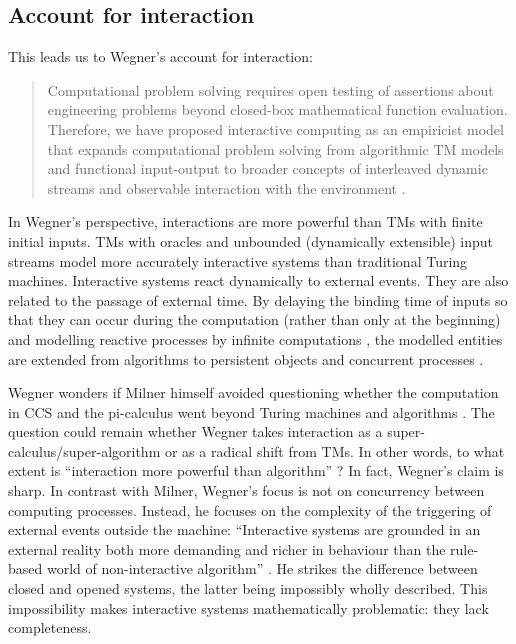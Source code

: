 \documentclass[a4paper, 11pt, twoside]{article}
\begin{document}
\subsection{Account for interaction}

This leads us to Wegner’s account for interaction: 
\begin{quote}
Computational problem solving requires open testing of assertions about engineering problems beyond closed-box mathematical function evaluation. Therefore, we have proposed interactive computing as an empiricist model that expands computational problem solving from algorithmic TM models and functional input-output to broader concepts of interleaved dynamic streams and observable interaction with the environment \parencite{Wegner2006}. 
\end{quote}

In Wegner's perspective, interactions are more powerful than TMs with finite initial inputs. TMs with oracles and unbounded (dynamically extensible) input streams model more accurately interactive systems than traditional Turing machines. Interactive systems react dynamically to external events. They are also related to the passage of external time. By delaying the binding time of inputs so that they can occur during the computation (rather than only at the beginning) and modelling reactive processes \parencite{Manna1992} by infinite computations \parencite{Thomas1990}, the modelled entities are extended from algorithms to persistent objects and concurrent processes \parencite{Milner1999}. 

Wegner wonders if Milner himself avoided questioning whether the computation in CCS and the pi-calculus went beyond Turing machines and algorithms \parencite{Wegner2003}. The question could remain whether Wegner takes interaction as a super-calculus/super-algorithm or as a radical shift from TMs. In other words, to what extent is ``interaction more powerful than algorithm'' \parencite{Wegner1997}?
In fact, Wegner's claim is sharp. In contrast with Milner, Wegner's focus is not on concurrency between computing processes. Instead, he focuses on the complexity of the triggering of external events outside the machine: ``Interactive systems are grounded in an external reality both more demanding and richer in behaviour than the rule-based world of non-interactive algorithm'' \parencite{Wegner1997}. He strikes the difference between closed and opened systems, the latter being impossibly wholly described. This impossibility makes interactive systems mathematically problematic: they lack completeness. 
\end{document}
